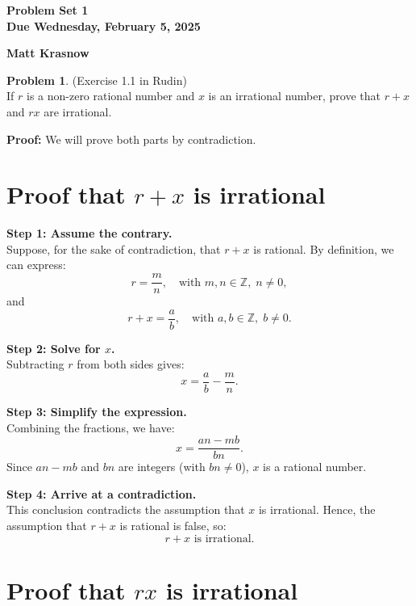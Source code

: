 \documentclass[12pt,oneside]{article}
\theoremstyle{definition}
\newtheorem{problem}{Problem}
\begin{document}
\pagestyle{fancy}

\begin{center}
\bf \Large
Problem Set 1 \\[0.5em]
\large
Due Wednesday, February 5, 2025
\end{center}
\begin{center}
\bf \Large
Matt Krasnow
\end{center}

\bigskip

\begin{problem}
(Exercise 1.1 in Rudin)\\
If \( r \) is a non-zero rational number and \( x \) is an irrational number, prove that \( r + x \) and \( r x \) are irrational.
\end{problem}

\textbf{Proof:} We will prove both parts by contradiction.

\section*{Proof that \( r + x \) is irrational}

\textbf{Step 1: Assume the contrary.}\\
Suppose, for the sake of contradiction, that \( r + x \) is rational. By definition, we can express:
\[
r = \frac{m}{n}, \quad \text{with } m, n \in \mathbb{Z}, \; n \neq 0,
\]
and
\[
r + x = \frac{a}{b}, \quad \text{with } a, b \in \mathbb{Z}, \; b \neq 0.
\]

\textbf{Step 2: Solve for \( x \).}\\
Subtracting \( r \) from both sides gives:
\[
x = \frac{a}{b} - \frac{m}{n}.
\]

\textbf{Step 3: Simplify the expression.}\\
Combining the fractions, we have:
\[
x = \frac{a n - m b}{b n}.
\]
Since \( a n - m b \) and \( b n \) are integers (with \( b n \neq 0 \)), \( x \) is a rational number.

\textbf{Step 4: Arrive at a contradiction.}\\
This conclusion contradicts the assumption that \( x \) is irrational. Hence, the assumption that \( r + x \) is rational is false, so:
\[
r + x \text{ is irrational.}
\]

\section*{Proof that \( r x \) is irrational}
\end{document}
